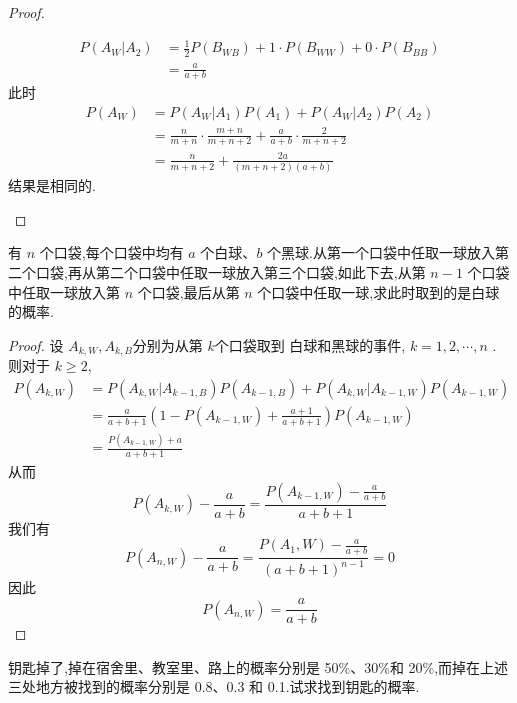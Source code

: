 \documentclass[../main.tex]{subfiles}
\begin{document}
\begin{proof}
\begin{enumerate}
\begin{remark}
\[           \begin{aligned}
            P\left( A_{W}|A_2 \right)&=  \frac{1 }{2 }P\left( B_{WB} \right)+ 1\cdot P\left( B_{WW} \right)   + 0\cdot P\left( B_{BB} \right) \\ 
             &= \frac{a }{a+ b } 
           \end{aligned}
            \]此时 \[
            \begin{aligned}
            P\left( A_{W} \right)&= P\left( A_{W}|A_1 \right)P\left( A_1 \right)+ P\left( A_{W}|A_2 \right)P\left( A_2 \right)      \\ 
             &= \frac{n }{m+ n }\cdot \frac{m+ n }{m+ n+ 2 }+ \frac{ a}{a+ b }\cdot \frac{2 }{m+ n+ 2 }    \\ 
              &= \frac{n }{m+ n+ 2 }+ \frac{2a }{\left( m+ n+ 2 \right)\left( a+ b \right)   }  
            \end{aligned}
            \]结果是相同的.
        \end{remark}
    \end{enumerate}
    
\end{proof}
\begin{exercise}{}{}
有 $n$ 个口袋,每个口袋中均有 $a$ 个白球、$b$ 个黑球.从第一个口袋中任取一球放入第二个口袋,再从第二个口袋中任取一球放入第三个口袋,如此下去,从第 $n-1$ 个口袋中任取一球放入第 $n$ 个口袋,最后从第 $n$ 个口袋中任取一球,求此时取到的是白球的概率.
\end{exercise}

\begin{proof}
    设 \(  A_{k,W} , A_{k,B}  \)分别为从第 \(  k  \)个口袋取到  白球和黑球的事件, \(  k= 1,2,\cdots ,n  \) . 则对于 \(  k\ge 2  \),   \[
    \begin{aligned}
    P\left( A_{k,W} \right)&= P\left( A_{k,W}|A_{k-1,B} \right)P\left( A_{k-1,B} \right)+ P\left( A_{k,W}|A_{k-1,W} \right)     P\left( A_{k-1,W} \right)\\ 
     &= \frac{a }{a+ b+ 1 }  \left( 1-P\left( A_{k-1,W} \right)+ \frac{a+ 1 }{a+ b+ 1 }   \right)P\left( A_{k-1,W} \right)\\ 
      &= \frac{P\left( A_{k-1,W} \right) + a }{a+ b+ 1 }   
    \end{aligned}
    \] 从而 \[
    P\left( A_{k,W} \right)-\frac{a }{a+ b }  = \frac{P\left( A_{k-1,W} \right)-\frac{a }{a+ b }   }{ a+ b+ 1} 
    \]我们有 \[
    P\left( A_{n,W} \right)-\frac{a }{a+ b }= \frac{P\left( A_{1},W \right)-\frac{a }{a+ b }   }{ \left( a+ b+ 1 \right)^{n-1} }= 0   
    \]因此 \[
    P\left( A_{n,W} \right)= \frac{a }{a+ b }  
    \]
\end{proof}
\begin{exercise}{}{}
钥匙掉了,掉在宿舍里、教室里、路上的概率分别是 50\%、30\%和 20\%,而掉在上述三处地方被找到的概率分别是 0.8、0.3 和 0.1.试求找到钥匙的概率.
\end{exercise}
\end{document}
